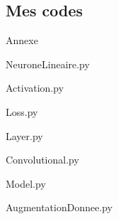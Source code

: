 \subsection{Mes codes}


\begin{frame}{Annexe}
    
\end{frame}


\begin{frame}{NeuroneLineaire.py}
    
\end{frame}


\begin{frame}{Activation.py}
    
\end{frame}


\begin{frame}{Loss.py}
    
\end{frame}


\begin{frame}{Layer.py}
    
\end{frame}


\begin{frame}{Convolutional.py}
    

\end{frame}


\begin{frame}{Model.py}
    
\end{frame}


\begin{frame}{AugmentationDonnee.py}
    
\end{frame}



